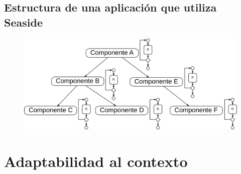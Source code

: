 \documentclass[
paper=128mm:96mm, %
fontsize=11pt, %
pagesize, %
parskip=half-, %
]{scrartcl} %
\theoremstyle{mythmstyle} %
\begin{document}
\clearpage





\subsection{Estructura de una aplicación que utiliza Seaside}

\begin{figure}[ht!]
\centering\includegraphics[width=0.8\linewidth]{Figures/Seaside}
\end{figure}

\clearpage






\section{Adaptabilidad al contexto}
\end{document}
